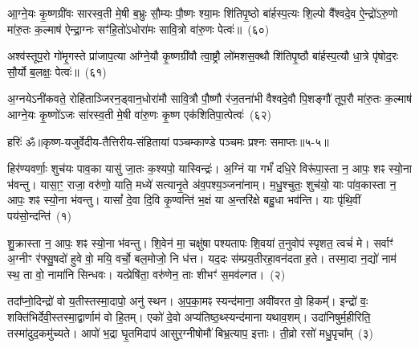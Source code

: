 {\anuvakamend[{अ॒ल॒जः सु॑प॒र्णो᳚\-ऽष्टाद॑शाष्टा॒द॑श}]}%

आ॒ग्ने॒यः कृ॒ष्णग्री॑वः सारस्व॒ती मे॒षी ब॒भ्रुः सौ॒म्यः पौ॒ष्णः श्या॒मः शि॑तिपृ॒ष्ठो बा॑र्\mbox{}हस्प॒त्यः शि॒ल्पो वै᳚श्वदे॒व ऐ॒न्द्रो॑\-ऽरु॒णो मा॑रु॒तः क॒ल्माष॑ ऐन्द्रा॒ग्नः सꣳ॑हि॒तो॑\-ऽधोरा॑मः सावि॒त्रो वा॑रु॒णः पेत्वः॑॥~(६०)

{\anuvakamend[{आ॒ग्ने॒यो द्वाविꣳ॑शतिः}]}%

अश्व॑स्तूप॒रो गो॑मृ॒गस्ते प्रा॑जाप॒त्या आ᳚ग्ने॒यौ कृ॒ष्णग्री॑वौ त्वा॒ष्ट्रौ लो॑मशस॒क्थौ शि॑तिपृ॒ष्ठौ बा॑र्\mbox{}हस्प॒त्यौ धा॒त्रे पृ॑षोद॒रः सौ॒र्यो ब॒लक्षः॒ पेत्वः॑॥~(६१)

{\anuvakamend[{अश्वः॒ षोड॑श}]}%

अ॒ग्नये\-ऽनी॑कवते॒ रोहि॑ताञ्जिरन॒ड्वान॒धोरा॑मौ सावि॒त्रौ पौ॒ष्णौ र॑ज॒तना॑भी वैश्वदे॒वौ पि॒शङ्गौ॑ तूप॒रौ मा॑रु॒तः क॒ल्माष॑ आग्ने॒यः कृ॒ष्णो॑\-ऽजः सा॑रस्व॒ती मे॒षी वा॑रु॒णः कृ॒ष्ण एक॑शितिपा॒त्पेत्वः॑~(६२)

{\anuvakamend[{अ॒ग्नयो\-ऽनी॑कवते॒ द्वाविꣳ॑शतिः}]}%

{हरिः॑ ॐ}{॥कृष्ण-यजुर्वेदीय-तैत्तिरीय-संहितायां पञ्चम्काण्डे पञ्चमः प्रश्नः समाप्तः॥५-५॥}

\setcounter{anuvakam}{0}
हिर॑ण्यवर्णाः॒ शुच॑यः पाव॒का यासु॑ जा॒तः क॒श्यपो॒ यास्विन्द्रः॑। अ॒ग्निं या गर्भं॑ दधि॒रे विरू॑पा॒स्ता न॒ आपः॒ शꣴ स्यो॒ना भ॑वन्तु। यासा॒ꣳ॒ राजा॒ वरु॑णो॒ याति॒ मध्ये॑ सत्यानृ॒ते अ॑व॒पश्य॒ञ्जना॑नाम्। म॒धु॒श्चुतः॒ शुच॑यो॒ याः पा॑व॒कास्ता न॒ आपः॒ शꣴ स्यो॒ना भ॑वन्तु। यासां᳚ दे॒वा दि॒वि कृ॒ण्वन्ति॑ भ॒क्षं या अ॒न्तरि॑क्षे बहु॒धा भव॑न्ति। याः पृ॑थि॒वीं पय॑सो॒न्दन्ति॑~(१)

शु॒क्रास्ता न॒ आपः॒ शꣴ स्यो॒ना भ॑वन्तु। शि॒वेन॑ मा॒ चक्षु॑षा पश्यतापः शि॒वया॑ त॒नुवोप॑ स्पृशत॒ त्वचं॑ मे। सर्वाꣳ॑ अ॒ग्नीꣳ र॑फ्सु॒षदो॑ हुवे वो॒ मयि॒ वर्चो॒ बल॒मोजो॒ नि ध॑त्त। यद॒दः स॑म्प्रय॒तीरहा॒वन॑दता ह॒ते। तस्मा॒दा न॒द्यो॑ नाम॑ स्थ॒ ता वो॒ नामा॑नि सिन्धवः। यत्प्रेषि॑ता॒ वरु॑णेन॒ ताः शीभꣳ॑ स॒मव॑ल्गत।~(२)

तदा᳚प्नो॒दिन्द्रो॑ वो य॒तीस्तस्मा॒दापो॒ अनु॑ स्थन। अ॒प॒का॒मꣴ स्यन्द॑माना॒ अवी॑वरत वो॒ हिकम्᳚। इन्द्रो॑ वः॒ शक्ति॑भिर्देवी॒स्तस्मा॒द्वार्णाम॑ वो हि॒तम्। एको॑ दे॒वो अप्य॑तिष्ठ॒थ्स्यन्द॑माना यथाव॒शम्। उदा॑निषुर्म॒हीरिति॒ तस्मा॑दुद॒कमु॑च्यते। आपो॑ भ॒द्रा घृ॒तमिदाप॑ आसुर॒ग्नी\-षोमौ॑ बिभ्र॒त्याप॒ इत्ताः। ती॒व्रो रसो॑ मधु॒पृचा᳚म्~(३)

